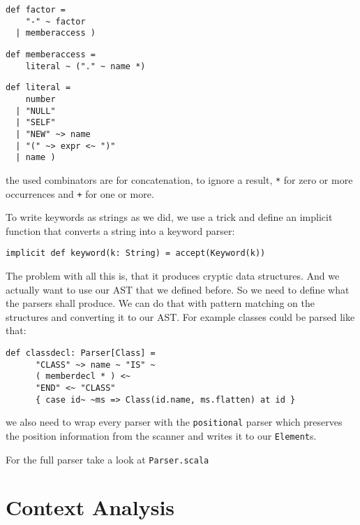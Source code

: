 \documentclass{style}
\begin{document}
\begin{lstlisting}[name=parser]
def factor = 
    "-" ~ factor                                        
  | memberaccess )
\end{lstlisting}
\begin{lstlisting}[name=parser]
def memberaccess =
    literal ~ ("." ~ name *)                            
\end{lstlisting}
\begin{lstlisting}[name=parser]
def literal = 
    number                                              
  | "NULL"                                              
  | "SELF"                                              
  | "NEW" ~> name                                       
  | "(" ~> expr <~ ")"
  | name ) 
\end{lstlisting}

the used combinators are for concatenation, to ignore a result, \texttt{*} for zero or more occurrences and \texttt{+} for one or more.

To write keywords as strings as we did, we use a trick and define an implicit function that converts a string into a keyword parser:

\begin{lstlisting}[name=parser]
implicit def keyword(k: String) = accept(Keyword(k))
\end{lstlisting}

The problem with all this is, that it produces cryptic data structures. And we actually want to use our AST that we defined before. So we need to define what the parsers shall produce. We can do that with pattern matching on the structures and converting it to our AST. For example classes could be parsed like that:

\begin{lstlisting}[name=parser]
  def classdecl: Parser[Class] =
      "CLASS" ~> name ~ "IS" ~
      ( memberdecl * ) <~
      "END" <~ "CLASS"                                    
      { case id~ ~ms => Class(id.name, ms.flatten) at id }
\end{lstlisting}

we also need to wrap every parser with the \texttt{positional} parser which preserves the position information from the scanner and writes it to our \texttt{Element}s.

For the full parser take a look at \texttt{Parser.scala}

\section{Context Analysis}
\end{document}
